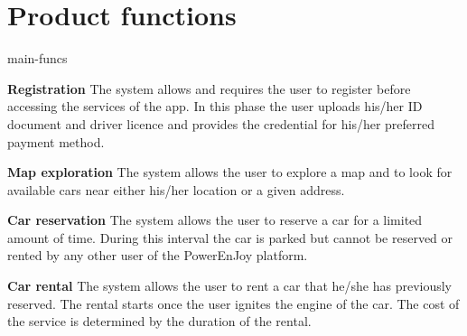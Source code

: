 \section{Product functions}

\begin{labeling}{main-funcs}
	\item[\textbf{Registration}] The system allows and requires the user to register before accessing the services of the app. In this phase the user uploads his/her ID document and driver licence and provides the credential for his/her preferred payment method.
	\item[\textbf{Map exploration}] The system allows the user to explore a map and to look for available cars near either his/her location or a given address.
	\item[\textbf{Car reservation}] The system allows the user to reserve a car for a limited amount of time. During this interval the car is parked but cannot be reserved or rented by any other user of the PowerEnJoy platform.
	\item[\textbf{Car rental}] The system allows the user to rent a car that he/she has previously reserved. The rental starts once the user ignites the engine of the car. The cost of the service is determined by the duration of the rental.
\end{labeling}